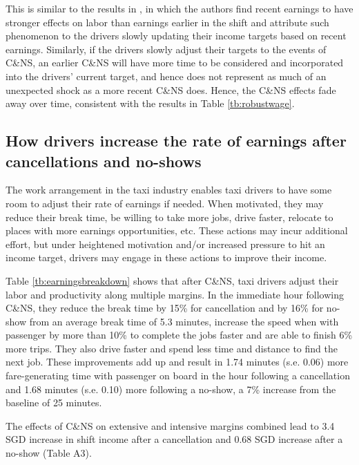 \documentclass[reviewmode,AEJ]{AEA}
\begin{document}
This is similar to the results in \citet{thakral2018daily}, in which the authors find recent
earnings to have stronger effects on labor than earnings earlier in the shift 
and attribute such phenomenon to the drivers slowly updating their income targets based on recent earnings.
Similarly, if the drivers slowly adjust their targets to the events of C\&NS, an earlier C\&NS will have
more time to be considered and incorporated into the drivers' current target, and hence does not represent
as much of an unexpected shock as a more recent C\&NS does. %
Hence, the C\&NS effects fade away over
time, consistent with the results in Table \ref{tb:robustwage}.


\subsection{How drivers increase the rate of earnings after cancellations and no-shows}
The work arrangement in the taxi industry enables taxi drivers to have some room to adjust their rate of earnings if needed. When motivated, they may reduce their break time, be willing to take more jobs, drive faster, relocate to places with more earnings opportunities, etc. These actions may incur additional effort, but under heightened motivation and/or increased pressure to hit an income target, drivers may engage 
in these actions to improve their income.

Table \ref{tb:earningsbreakdown} shows that after C\&NS, taxi drivers adjust their labor and productivity along multiple margins. In the immediate hour following C\&NS, they reduce the break time by 15\% %
for cancellation and by 16\% %
for no-show from an average break time of 5.3 minutes, increase the speed when with passenger by more than 10\% to complete the jobs faster %
and are able to finish 6\% more trips. They also drive faster and spend less time and distance to find the next job. These improvements add up and result in 1.74 minutes (s.e. 0.06) more fare-generating time with passenger on board in the hour following a cancellation and 1.68 minutes (s.e. 0.10) more following a no-show, a 7\% increase from the baseline of 25 minutes.  


The effects of C\&NS on extensive and intensive margins combined lead to 3.4 SGD increase in shift income after a cancellation and 0.68 SGD increase after a no-show (Table A3).
\end{document}
